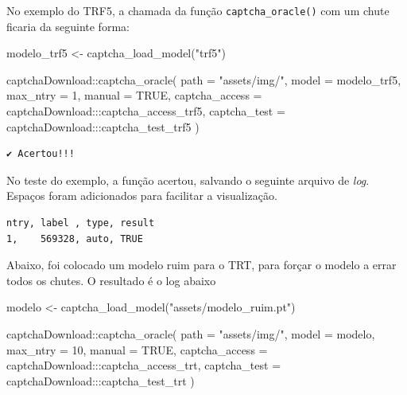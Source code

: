 \documentclass[12pt,twoside,brazilian]{book}
\newenvironment{Shaded}{\begin{snugshade}}{\end{snugshade}}
\newcommand{\AttributeTok}[1]{\textcolor[rgb]{0.40,0.45,0.13}{#1}}
\newcommand{\ConstantTok}[1]{\textcolor[rgb]{0.56,0.35,0.01}{#1}}
\newcommand{\DecValTok}[1]{\textcolor[rgb]{0.68,0.00,0.00}{#1}}
\newcommand{\FunctionTok}[1]{\textcolor[rgb]{0.28,0.35,0.67}{#1}}
\newcommand{\NormalTok}[1]{\textcolor[rgb]{0.00,0.23,0.31}{#1}}
\newcommand{\OtherTok}[1]{\textcolor[rgb]{0.00,0.23,0.31}{#1}}
\newcommand{\SpecialCharTok}[1]{\textcolor[rgb]{0.37,0.37,0.37}{#1}}
\newcommand{\StringTok}[1]{\textcolor[rgb]{0.13,0.47,0.30}{#1}}
\begin{document}
No exemplo do TRF5, a chamada da função \texttt{captcha\_oracle()} com
um chute ficaria da seguinte forma:

\begin{Shaded}
\begin{Highlighting}[]
\NormalTok{modelo\_trf5 }\OtherTok{\textless{}{-}} \FunctionTok{captcha\_load\_model}\NormalTok{(}\StringTok{"trf5"}\NormalTok{)}

\NormalTok{captchaDownload}\SpecialCharTok{::}\FunctionTok{captcha\_oracle}\NormalTok{(}
  \AttributeTok{path =} \StringTok{"assets/img/"}\NormalTok{,}
  \AttributeTok{model =}\NormalTok{ modelo\_trf5, }
  \AttributeTok{max\_ntry =} \DecValTok{1}\NormalTok{,}
  \AttributeTok{manual =} \ConstantTok{TRUE}\NormalTok{, }
  \AttributeTok{captcha\_access =}\NormalTok{ captchaDownload}\SpecialCharTok{:::}\NormalTok{captcha\_access\_trf5,}
  \AttributeTok{captcha\_test =}\NormalTok{ captchaDownload}\SpecialCharTok{:::}\NormalTok{captcha\_test\_trf5}
\NormalTok{)}
\end{Highlighting}
\end{Shaded}

\begin{verbatim}
✔ Acertou!!!
\end{verbatim}

No teste do exemplo, a função acertou, salvando o seguinte arquivo de
\emph{log}. Espaços foram adicionados para facilitar a visualização.

\begin{verbatim}
ntry, label , type, result
1,    569328, auto, TRUE
\end{verbatim}

Abaixo, foi colocado um modelo ruim para o TRT, para forçar o modelo a
errar todos os chutes. O resultado é o log abaixo

\begin{Shaded}
\begin{Highlighting}[]
\NormalTok{modelo }\OtherTok{\textless{}{-}} \FunctionTok{captcha\_load\_model}\NormalTok{(}\StringTok{"assets/modelo\_ruim.pt"}\NormalTok{)}

\NormalTok{captchaDownload}\SpecialCharTok{::}\FunctionTok{captcha\_oracle}\NormalTok{(}
  \AttributeTok{path =} \StringTok{"assets/img/"}\NormalTok{,}
  \AttributeTok{model =}\NormalTok{ modelo, }
  \AttributeTok{max\_ntry =} \DecValTok{10}\NormalTok{,}
  \AttributeTok{manual =} \ConstantTok{TRUE}\NormalTok{, }
  \AttributeTok{captcha\_access =}\NormalTok{ captchaDownload}\SpecialCharTok{:::}\NormalTok{captcha\_access\_trt,}
  \AttributeTok{captcha\_test =}\NormalTok{ captchaDownload}\SpecialCharTok{:::}\NormalTok{captcha\_test\_trt}
\NormalTok{)}
\end{Highlighting}
\end{Shaded}
\end{document}
